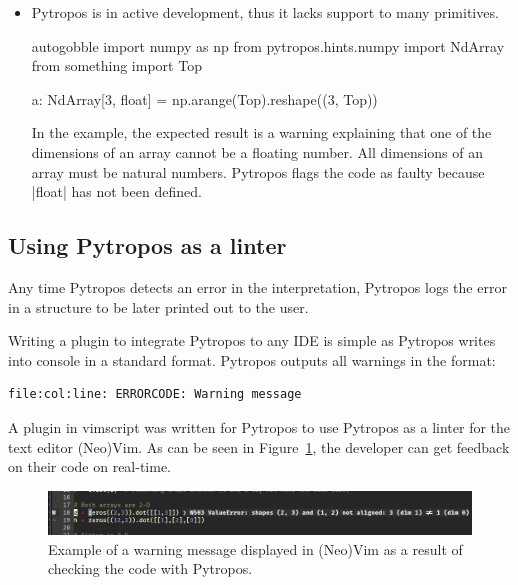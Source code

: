 \begin{itemize}
\item Pytropos is in active development, thus it lacks support to many primitives.

  \begin{pythoncode*}{autogobble}
    import numpy as np
    from pytropos.hints.numpy import NdArray
    from something import Top

    a: NdArray[3, float] = np.arange(Top).reshape((3, Top))
  \end{pythoncode*}

  In the example, the expected result is a warning explaining that one of the dimensions
  of an array cannot be a floating number. All dimensions of an array must be natural
  numbers. Pytropos flags the code as faulty because \pycode|float| has not been defined.

\end{itemize}


\subsection{Using Pytropos as a linter}

Any time Pytropos detects an error in the interpretation, Pytropos logs the error in a
structure to be later printed out to the user.

Writing a plugin to integrate Pytropos to any IDE is simple as Pytropos writes into console
in a standard format. Pytropos outputs all warnings in the format:

\begin{verbatim}
file:col:line: ERRORCODE: Warning message
\end{verbatim}

A plugin in vimscript was written for Pytropos to use Pytropos as a linter for the text
editor (Neo)Vim. As can be seen in Figure~\ref{pytroposlinter}, the developer can get
feedback on their code on real-time.

\begin{figure}
\includegraphics[width=\textwidth]{figures/neovim-linter.png}
\caption{Example of a warning message displayed in (Neo)Vim as a result of checking the code
  with Pytropos.\label{pytroposlinter}}
\end{figure}


